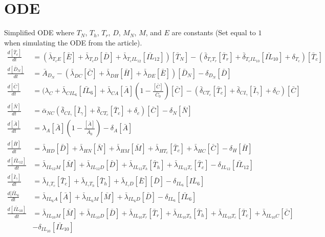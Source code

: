 \documentclass{article}
\begin{document}
\section{ODE}
\label{appendix:ODE}
Simplified ODE where $T_N$, $T_h$, $T_r$, $D$, $M_N$, $M$, and $E$ are constants (Set equal to $1$ when simulating the ODE from the article).
\begin{align}
    \frac{d[\bar{T}_c]}{dt} &= (\bar{\lambda}_{T_cE}[\bar{E}]+\bar{\lambda}_{T_cD}[\bar{D}]+\bar{\lambda}_{T_cIL_{12}}[\bar{IL}_{12}])[\bar{T}_N]-(\bar{\delta}_{T_cT_r}[\bar{T}_r]+\bar{\delta}_{T_cIL_{10}}[\bar{IL}_{10}]+\delta_{T_c})[\bar{T}_c]\\
    \frac{d[\bar{D}_N]}{dt} &= \bar{A}_{D_N}-(\bar{\lambda}_{DC}[\bar{C}]+\bar{\lambda}_{DH}[\bar{H}]+\bar{\lambda}_{DE}[\bar{E}])[\bar{D}_N]-\delta_{D_N}[\bar{D}]\\
    \frac{d[\bar{C}]}{dt} &= (\lambda_C+\bar{\lambda}_{CIL_6}[\bar{IL}_6]+\bar{\lambda}_{CA}[\bar{A}]\left(1-\frac{[\bar{C}]}{\bar{C}_0} \right)[\bar{C}]-(\bar{\delta}_{CT_c}[\bar{T}_c]+\bar{\delta}_{CI_\gamma}[\bar{I}_\gamma]+\delta_C)[\bar{C}]\\
    \frac{d[\bar{N}]}{dt} &= \bar{\alpha}_{NC}(\bar{\delta}_{CI_\gamma}[\bar{I}_\gamma]+\bar{\delta}_{CT_c}[\bar{T}_c]+\delta_c)[\bar{C}]-\delta_N[\bar{N}]\\
    \frac{d[\bar{A}]}{dt} &= \lambda_A[\bar{A}]\left(1-\frac{[\bar{A}]}{\bar{A}_0}\right)-\delta_A[\bar{A}]\\
    \frac{d[\bar{H}]}{dt} &=\bar{\lambda}_{HD}[\bar{D}]+\bar{\lambda}_{HN}[\bar{N}]+\bar{\lambda}_{HM}[\bar{M}]+\bar{\lambda}_{HT_c}[\bar{T}_c]+\bar{\lambda}_{HC}[\bar{C}]-\delta_H[\bar{H}]\\
    \frac{d[\bar{IL}_{12}]}{dt} &= \bar{\lambda}_{IL_{12}M}[\bar{M}]+\bar{\lambda}_{IL_{12}D}[\bar{D}]+\bar{\lambda}_{IL_{12}T_h}[\bar{T}_h]+\bar{\lambda}_{IL_{12}T_c}[\bar{T}_c]-\delta_{IL_{12}}[\bar{IL}_{12}]\\
    \frac{d[\bar{I}_\gamma]}{dt} &= \bar{\lambda}_{I_{\gamma}T_c}[\bar{T}_c]+\bar{\lambda}_{I_{\gamma}T_h}[\bar{T}_h]+\bar{\lambda}_{I_{\gamma}D}[\bar{E}][\bar{D}]-\delta_{IL_6}[\bar{IL_6}]\\
    \frac{d[\bar{IL}_6}{dt} &= \bar{\lambda}_{IL_6A}[\bar{A}]+\bar{\lambda}_{IL_6M}[\bar{M}]+\bar{\lambda}_{IL_6D}[\bar{D}]-\delta_{IL_6}[\bar{IL}_6]
     \end{align}
     \begin{equation}
    \begin{aligned}
    \frac{d[\bar{IL}_{10}]}{dt} &=\bar{\lambda}_{IL_{10}M}[\bar{M}]+\bar{\lambda}_{IL_{10}D}[\bar{D}]+\bar{\lambda}_{IL_{10}T_r}[\bar{T}_r]+\bar{\lambda}_{IL_{10}T_h}[\bar{T}_h]+\bar{\lambda}_{IL_{10}T_c}[\bar{T}_c]+\bar{\lambda}_{IL_{10}C}[\bar{C}]\\
    &-\delta_{IL_{10}}[\bar{IL}_{10}]
    \end{aligned}
     \end{equation}
\newpage
\end{document}
